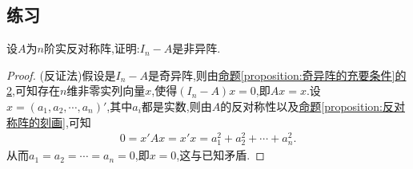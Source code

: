 \documentclass[../../main.tex]{subfiles}
\begin{document}
\subsection{练习}

\begin{exercise}
设\(A\)为\(n\)阶实反对称阵,证明:\(I_n - A\)是非异阵.
\end{exercise}
\begin{proof}
(反证法)假设是$I_n-A$是奇异阵,则由\hyperref[proposition:奇异阵的充要条件2]{命题\ref{proposition:奇异阵的充要条件}的2},可知存在\(n\)维非零实列向量\(x\),使得\((I_n - A)x = 0\),即\(Ax = x\).设\(x = (a_1,a_2,\cdots,a_n)'\),其中\(a_i\)都是实数,则由\(A\)的反对称性以及\hyperref[proposition:反对称阵的刻画]{命题\ref{proposition:反对称阵的刻画}},可知
\begin{align*}
0 = x'Ax = x'x = a_1^2 + a_2^2 + \cdots + a_n^2.
\end{align*}
从而\(a_1 = a_2 = \cdots = a_n = 0\),即\(x = 0\),这与已知矛盾.
\end{proof}
\end{document}
